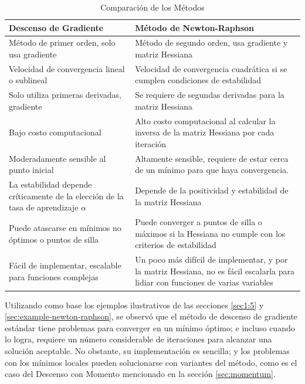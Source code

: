 \documentclass[conference]{IEEEtran}
\begin{document}
\begin{table}[htbp]
\caption{Comparación de los Métodos}
    \begin{center}
        \begin{tabular}{|p{3.5cm}|p{3.5cm}|}
        \hline
        \textbf{Descenso de Gradiente} & \textbf{Método de Newton-Raphson} \\
        \hline
        Método de primer orden, solo usa gradiente &
        Método de segundo orden, usa gradiente y matriz Hessiana \\
        \hline
        Velocidad de convergencia lineal o sublineal & Velocidad de convergencia cuadrática si se cumplen condiciones de estabilidad \\
        \hline
        Solo utiliza primeras derivadas, gradiente & Se requiere de segundas derivadas para la matriz Hessiana \\
        \hline
        Bajo costo computacional & Alto costo computacional al calcular la inversa de la matriz Hessiana por cada iteración \\
        \hline
        Moderadamente sensible al punto inicial & Altamente sensible, requiere de estar cerca de un mínimo para que haya convergencia. \\
        \hline
        La estabilidad depende críticamente de la elección de la tasa de aprendizaje $\alpha$ & Depende de la positividad y estabilidad de la matriz Hessiana \\
        \hline
        Puede atascarse en mínimos no óptimos o puntos de silla & Puede converger a puntos de silla o máximos si la Hessiana no cumple con los criterios de estabilidad \\
        \hline
        Fácil de implementar, escalable para funciones complejas & Un poco más difícil de implementar, y por la matriz Hessiana, no es fácil escalarla para lidiar con funciones de varias variables \\
        \hline
        \end{tabular}
    \label{tab:comparison}
    \end{center}
\end{table}

Utilizando como base los ejemplos ilustrativos de las secciones \ref{sec1:5} y \ref{sec:example-newton-raphson}, se observó que el método de descenso de gradiente estándar tiene problemas para converger en un mínimo óptimo; e incluso cuando lo logra, requiere un número considerable de iteraciones para alcanzar una solución aceptable. No obstante, su implementación es sencilla; y los problemas con los mínimos locales pueden solucionarse con variantes del método, como es el caso del Descenso con Momento mencionado en la sección \ref{sec:momentum}.
\end{document}
